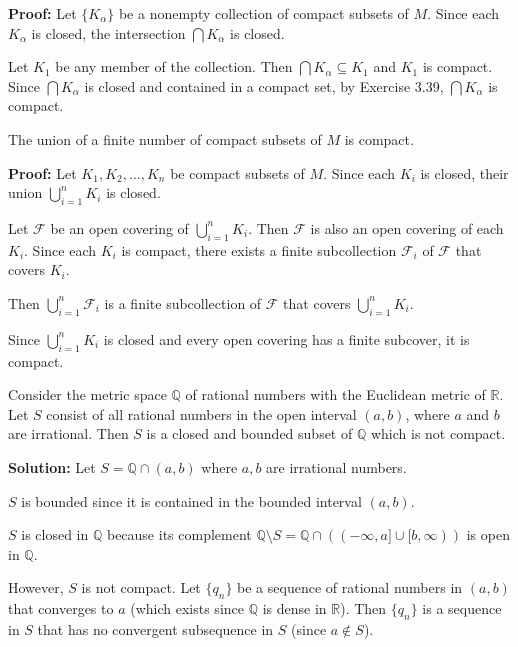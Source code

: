 \textbf{Proof:} Let $\{K_\alpha\}$ be a nonempty collection of compact subsets of $M$. Since each $K_\alpha$ is closed, the intersection $\bigcap K_\alpha$ is closed.

Let $K_1$ be any member of the collection. Then $\bigcap K_\alpha \subseteq K_1$ and $K_1$ is compact. Since $\bigcap K_\alpha$ is closed and contained in a compact set, by Exercise 3.39, $\bigcap K_\alpha$ is compact.

\begin{problembox}
The union of a finite number of compact subsets of \( M \) is compact.
\end{problembox}

\textbf{Proof:} Let $K_1, K_2, \ldots, K_n$ be compact subsets of $M$. Since each $K_i$ is closed, their union $\bigcup_{i=1}^n K_i$ is closed.

Let $\mathcal{F}$ be an open covering of $\bigcup_{i=1}^n K_i$. Then $\mathcal{F}$ is also an open covering of each $K_i$. Since each $K_i$ is compact, there exists a finite subcollection $\mathcal{F}_i$ of $\mathcal{F}$ that covers $K_i$.

Then $\bigcup_{i=1}^n \mathcal{F}_i$ is a finite subcollection of $\mathcal{F}$ that covers $\bigcup_{i=1}^n K_i$.

Since $\bigcup_{i=1}^n K_i$ is closed and every open covering has a finite subcover, it is compact.

\begin{problembox}
Consider the metric space \( \mathbb{Q} \) of rational numbers with the Euclidean metric of \( \mathbb{R} \). Let \( S \) consist of all rational numbers in the open interval \((a, b)\), where \( a \) and \( b \) are irrational. Then \( S \) is a closed and bounded subset of \( \mathbb{Q} \) which is not compact.
\end{problembox}

\textbf{Solution:} Let $S = \mathbb{Q} \cap (a,b)$ where $a, b$ are irrational numbers.

$S$ is bounded since it is contained in the bounded interval $(a,b)$.

$S$ is closed in $\mathbb{Q}$ because its complement $\mathbb{Q} \setminus S = \mathbb{Q} \cap ((-\infty,a] \cup [b,\infty))$ is open in $\mathbb{Q}$.

However, $S$ is not compact. Let $\{q_n\}$ be a sequence of rational numbers in $(a,b)$ that converges to $a$ (which exists since $\mathbb{Q}$ is dense in $\mathbb{R}$). Then $\{q_n\}$ is a sequence in $S$ that has no convergent subsequence in $S$ (since $a \notin S$).

